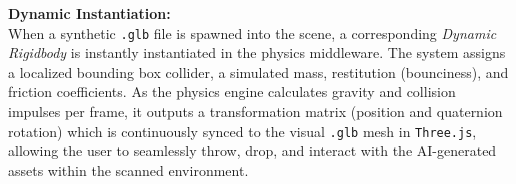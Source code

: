 \vspace{0.2cm}
\textbf{Dynamic Instantiation:} \\
When a synthetic \texttt{.glb} file is spawned into the scene, a corresponding \textit{Dynamic Rigidbody} is instantly instantiated in the physics middleware. The system assigns a localized bounding box collider, a simulated mass, restitution (bounciness), and friction coefficients. As the physics engine calculates gravity and collision impulses per frame, it outputs a transformation matrix (position and quaternion rotation) which is continuously synced to the visual \texttt{.glb} mesh in \texttt{Three.js}, allowing the user to seamlessly throw, drop, and interact with the AI-generated assets within the scanned environment.